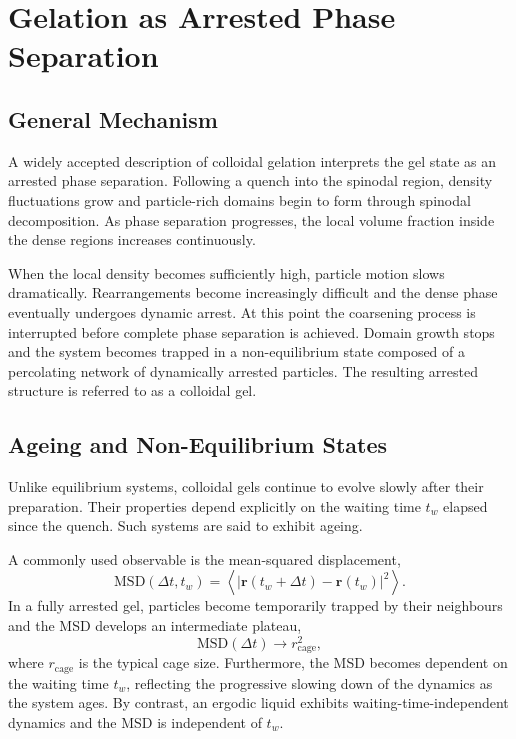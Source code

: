 \documentclass[11pt,a4paper]{article}
\begin{document}
\section{Gelation as Arrested Phase Separation}

\subsection{General Mechanism}

A widely accepted description of colloidal gelation interprets the gel state as an arrested phase separation. Following a quench into the spinodal region, density fluctuations grow and particle-rich domains begin to form through spinodal decomposition. As phase separation progresses, the local volume fraction inside the dense regions increases continuously.

When the local density becomes sufficiently high, particle motion slows dramatically. Rearrangements become increasingly difficult and the dense phase eventually undergoes dynamic arrest. At this point the coarsening process is interrupted before complete phase separation is achieved. Domain growth stops and the system becomes trapped in a non-equilibrium state composed of a percolating network of dynamically arrested particles. The resulting arrested structure is referred to as a colloidal gel.

\subsection{Ageing and Non-Equilibrium States}

Unlike equilibrium systems, colloidal gels continue to evolve slowly after their preparation. Their properties depend explicitly on the waiting time $t_w$ elapsed since the quench. Such systems are said to exhibit ageing.

A commonly used observable is the mean-squared displacement,
\begin{equation}
    \mathrm{MSD}(\Delta t,t_w)
    =
    \left\langle
    \left|\mathbf r(t_w+\Delta t)-\mathbf r(t_w)\right|^2
    \right\rangle.
    \label{eq:msd_ageing}
\end{equation}
In a fully arrested gel, particles become temporarily trapped by their neighbours and the MSD develops an intermediate plateau,
\begin{equation}
    \mathrm{MSD}(\Delta t) \rightarrow r_{\mathrm{cage}}^2,
\end{equation}
where $r_{\mathrm{cage}}$ is the typical cage size. Furthermore, the MSD becomes dependent on the waiting time $t_w$, reflecting the progressive slowing down of the dynamics as the system ages. By contrast, an ergodic liquid exhibits waiting-time-independent dynamics and the MSD is independent of $t_w$.
\end{document}
